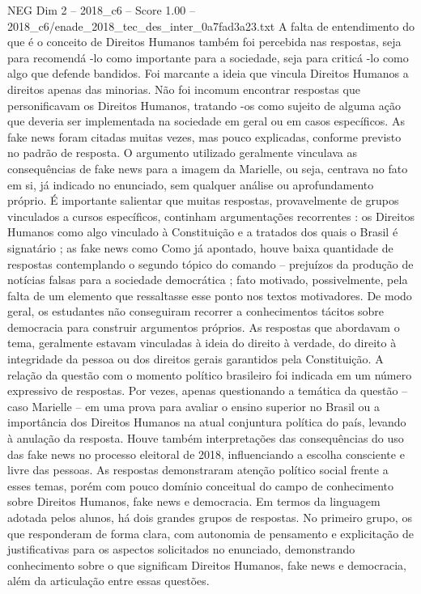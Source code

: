 \begin{textsample}{NEG Dim 2 – 2018\_c6 – Score 1.00 – 2018\_c6/enade\_2018\_tec\_des\_inter\_0a7fad3a23.txt}
A falta de entendimento do que é o conceito de Direitos Humanos também foi percebida nas respostas, seja para recomendá -lo como importante para a sociedade, seja para criticá -lo como algo que defende bandidos.
Foi marcante a ideia que vincula Direitos Humanos a direitos apenas das minorias.
Não foi incomum encontrar respostas que personificavam os Direitos Humanos, tratando -os como sujeito de alguma ação que deveria ser implementada na sociedade em geral ou em casos específicos.
As fake news foram citadas muitas vezes, mas pouco explicadas, conforme previsto no padrão de resposta.
O argumento utilizado geralmente vinculava as consequências de fake news para a imagem da Marielle, ou seja, centrava no fato em si, já indicado no enunciado, sem qualquer análise ou aprofundamento próprio.
É importante salientar que muitas respostas, provavelmente de grupos vinculados a cursos específicos, continham argumentações recorrentes : os Direitos Humanos como algo vinculado à Constituição e a tratados dos quais o Brasil é signatário ; as fake news como Como já apontado, houve baixa quantidade de respostas contemplando o segundo tópico do comando – prejuízos da produção de notícias falsas para a sociedade democrática ; fato motivado, possivelmente, pela falta de um elemento que ressaltasse esse ponto nos textos motivadores.
De modo geral, os estudantes não conseguiram recorrer a conhecimentos tácitos sobre democracia para construir argumentos próprios.
As respostas que abordavam o tema, geralmente estavam vinculadas à ideia do direito à verdade, do direito à integridade da pessoa ou dos direitos gerais garantidos pela Constituição.
A relação da questão com o momento político brasileiro foi indicada em um número expressivo de respostas.
Por vezes, apenas questionando a temática da questão – caso Marielle – em uma prova para avaliar o ensino superior no Brasil ou a importância dos Direitos Humanos na atual conjuntura política do país, levando à anulação da resposta.
Houve também interpretações das consequências do uso das fake news no processo eleitoral de 2018, influenciando a escolha consciente e livre das pessoas.
As respostas demonstraram atenção político social frente a esses temas, porém com pouco domínio conceitual do campo de conhecimento sobre Direitos Humanos, fake news e democracia.
Em termos da linguagem adotada pelos alunos, há dois grandes grupos de respostas.
No primeiro grupo, os que responderam de forma clara, com autonomia de pensamento e explicitação de justificativas para os aspectos solicitados no enunciado, demonstrando conhecimento sobre o que significam Direitos Humanos, fake news e democracia, além da articulação entre essas questões.

\end{textsample}

